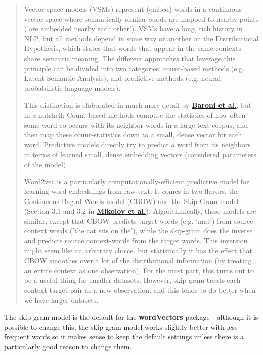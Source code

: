 \documentclass[12pt]{article}
\begin{document}
\begin{quote}
Vector space models (VSMs) represent (embed) words in a continuous vector space where semantically similar words are mapped to nearby points ('are embedded nearby each other'). VSMs have a long, rich history in NLP, but all methods depend in some way or another on the Distributional Hypothesis, which states that words that appear in the same contexts share semantic meaning. The different approaches that leverage this principle can be divided into two categories: count-based methods (e.g. Latent Semantic Analysis), and predictive methods (e.g. neural probabilistic language models).


This distinction is elaborated in much more detail by \href{http://clic.cimec.unitn.it/marco/publications/acl2014/baroni-etal-countpredict-acl2014.pdf}{\textbf{Baroni et al.}}, but in a nutshell: Count-based methods compute the statistics of how often some word co-occurs with its neighbor words in a large text corpus, and then map these count-statistics down to a small, dense vector for each word. Predictive models directly try to predict a word from its neighbors in terms of learned small, dense embedding vectors (considered parameters of the model).


Word2vec is a particularly computationally-efficient predictive model for learning word embeddings from raw text. It comes in two flavors, the Continuous Bag-of-Words model (CBOW) and the Skip-Gram model (Section 3.1 and 3.2 in \href{https://arxiv.org/pdf/1301.3781.pdf}{\textbf{Mikolov et al.}}). Algorithmically, these models are similar, except that CBOW predicts target words (e.g. 'mat') from source context words ('the cat sits on the'), while the skip-gram does the inverse and predicts source context-words from the target words. This inversion might seem like an arbitrary choice, but statistically it has the effect that CBOW smoothes over a lot of the distributional information (by treating an entire context as one observation). For the most part, this turns out to be a useful thing for smaller datasets. However, skip-gram treats each context-target pair as a new observation, and this tends to do better when we have larger datasets.
\end{quote}

The skip-gram model is the default for the \textbf{wordVectors} package - although it is possible to change this, the skip-gram model works slightly better with less frequent words so it makes sense to keep the default settings unless there is a particularly good reason to change them.
\end{document}
